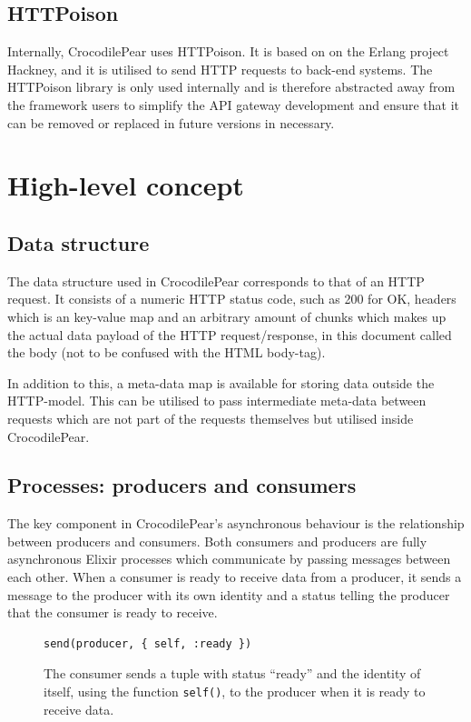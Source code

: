 \documentclass{cslthse-msc}
\begin{document}
\subsection{HTTPoison}
Internally, CrocodilePear uses HTTPoison\cite{httpoison}. It is based on on the Erlang project Hackney\cite{hackney}, and it is utilised to send HTTP requests to back-end systems. The HTTPoison library is only used internally and is therefore abstracted away from the framework users to simplify the API gateway development and ensure that it can be removed or replaced in future versions in necessary.

\section{High-level concept}

\subsection{Data structure}
The data structure used in CrocodilePear corresponds to that of an HTTP request. It consists of a numeric HTTP status code, such as 200 for OK\cite{http_status_codes}, headers which is an key-value map and an arbitrary amount of chunks which makes up the actual data payload of the HTTP request/response, in this document called the body (not to be confused with the HTML body-tag).

In addition to this, a meta-data map is available for storing data outside the HTTP-model. This can be utilised to pass intermediate meta-data between requests which are not part of the requests themselves but utilised inside CrocodilePear.

\subsection{Processes: producers and consumers}
The key component in CrocodilePear's asynchronous behaviour is the relationship between producers and consumers. Both consumers and producers are fully asynchronous Elixir processes which communicate by passing messages between each other. When a consumer is ready to receive data from a producer, it sends a message to the producer with its own identity and a status telling the producer that the consumer is ready to receive.

\begin{figure}[H]
  \centering
\begin{lstlisting}[breaklines=true,frame=single]
send(producer, { self, :ready })	
\end{lstlisting}
  \caption{The consumer sends a tuple with status \enquote{ready} and the identity of itself, using the function \lstinline{self()}, to the producer when it is ready to receive data.}
\end{figure}
\end{document}

